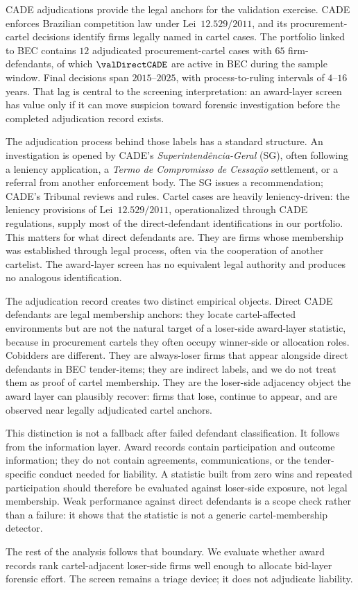 CADE adjudications provide the legal anchors for the validation
exercise. CADE enforces Brazilian competition law under
Lei~$12.529/2011$, and its procurement-cartel decisions identify
firms legally named in cartel cases. The portfolio linked to
BEC contains $12$ adjudicated procurement-cartel cases with $65$
firm-defendants, of which $\valDirectCADE$ are active in BEC
during the sample window. Final decisions span
$2015$--$2025$, with process-to-ruling intervals of $4$--$16$
years. That lag is central to the screening interpretation: an
award-layer screen has value only if it can move suspicion
toward forensic investigation before the completed adjudication
record exists.

The adjudication process behind those labels has a standard
structure. An investigation is opened by CADE's
\emph{Superintend\^encia-Geral} (SG), often following a
leniency application, a \emph{Termo de Compromisso de Cessa\c{c}\~ao}
settlement, or a referral from another enforcement body. The
SG issues a recommendation; CADE's Tribunal reviews and rules.
Cartel cases are heavily leniency-driven: the leniency
provisions of Lei~$12.529/2011$, operationalized through CADE
regulations, supply most of the direct-defendant identifications
in our portfolio. This matters for what direct defendants are.
They are firms whose membership was established through legal
process, often via the cooperation of another cartelist. The
award-layer screen has no equivalent legal authority and
produces no analogous identification.

The adjudication record creates two distinct empirical objects.
Direct CADE defendants are legal membership anchors: they
locate cartel-affected environments but are not the natural
target of a loser-side award-layer statistic, because in
procurement cartels they often occupy winner-side or allocation
roles. Cobidders are different. They are always-loser firms
that appear alongside direct defendants in BEC tender-items;
they are indirect labels, and we do not treat them as proof of
cartel membership. They are the loser-side adjacency object the
award layer can plausibly recover: firms that lose, continue to
appear, and are observed near legally adjudicated cartel
anchors.

This distinction is not a fallback after failed defendant
classification. It follows from the information layer. Award
records contain participation and outcome information; they do
not contain agreements, communications, or the tender-specific
conduct needed for liability. A statistic built from zero wins
and repeated participation should therefore be evaluated against
loser-side exposure, not legal membership. Weak performance
against direct defendants is a scope check rather than a
failure: it shows that the statistic is not a generic
cartel-membership detector.

The rest of the analysis follows that boundary. We evaluate
whether award records rank cartel-adjacent loser-side firms well
enough to allocate bid-layer forensic effort. The screen remains
a triage device; it does not adjudicate liability.
